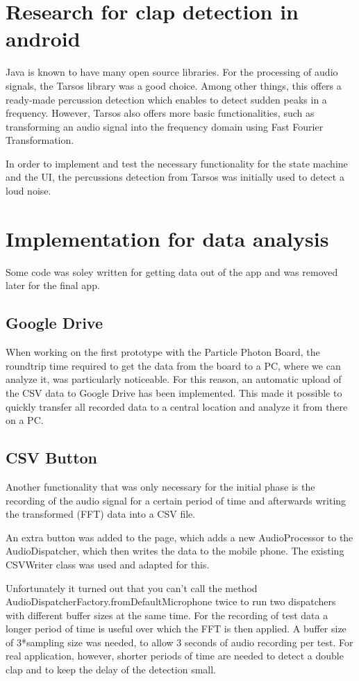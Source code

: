 \documentclass
[
 12pt, %
       DIV12,
       a4paper,
       oneside,
       titlepage,
       parskip=half,
       headings=normal,
       listof=totoc,
       bibliography=totoc,
       index=totoc,
       captions=tableheading,
       ]{scrreprt}
\begin{document}
\section{Research for clap detection in android}
\label{sec:orgc78ecb4}
Java is known to have many open source libraries. For the processing of audio
signals, the Tarsos library was a good choice. Among other things, this offers a
ready-made percussion detection which enables to detect sudden peaks in a
frequency. However, Tarsos also offers more basic functionalities, such as
transforming an audio signal into the frequency domain using Fast Fourier
Transformation.

In order to implement and test the necessary functionality for the state machine
and the UI, the percussions detection from Tarsos was initially used to detect a
loud noise.

\section{Implementation for data analysis}
\label{sec:org29c2ba8}
Some code was soley written for getting data out of the app and was removed 
later for the final app.

\subsection{Google Drive}
\label{sec:orgfdfd3aa}
When working on the first prototype with the Particle Photon Board, the
roundtrip time required to get the data from the board to a PC, where we can
analyze it, was particularly noticeable. For this reason, an automatic upload of
the CSV data to Google Drive has been implemented. This made it possible to
quickly transfer all recorded data to a central location and analyze it from
there on a PC.
\subsection{CSV Button}
\label{sec:orgcc3314e}
Another functionality that was only necessary for the initial phase is the
recording of the audio signal for a certain period of time and afterwards
writing the transformed (FFT) data into a CSV file.

An extra button was added to the page, which adds a new AudioProcessor to the
AudioDispatcher, which then writes the data to the mobile phone. The existing
CSVWriter class was used and adapted for this.

Unfortunately it turned out that you can't call the method
AudioDispatcherFactory.fromDefaultMicrophone twice to run two dispatchers with
different buffer sizes at the same time. For the recording of test data a longer
period of time is useful over which the FFT is then applied. A buffer size of
3*sampling size was needed, to allow 3 seconds of audio recording per test. For
real application, however, shorter periods of time are needed to detect a double
clap and to keep the delay of the detection small.
\end{document}
